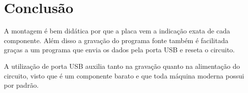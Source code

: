 \section{Conclusão}\label{conclusuxe3o}

A montagem é bem didática por que a placa vem a indicação exata de cada
componente. Além disso a gravação do programa fonte também é facilitada
graças a um programa que envia os dados pela porta USB e reseta o
circuito.

A utilização de porta USB auxilia tanto na gravação quanto na
alimentação do circuito, visto que é um componente barato e que toda
máquina moderna possui por padrão.
